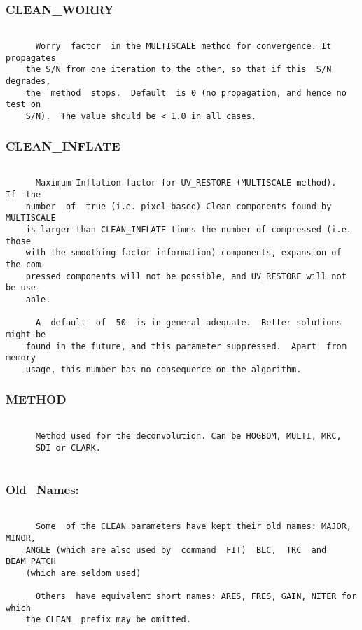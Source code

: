 \subsubsection{CLEAN\_WORRY}
\begin{verbatim}

      Worry  factor  in the MULTISCALE method for convergence. It propagates
    the S/N from one iteration to the other, so that if this  S/N  degrades,
    the  method  stops.  Default  is 0 (no propagation, and hence no test on
    S/N).  The value should be < 1.0 in all cases.

\end{verbatim}
\subsubsection{CLEAN\_INFLATE}
\begin{verbatim}

      Maximum Inflation factor for UV_RESTORE (MULTISCALE method).   If  the
    number  of  true (i.e. pixel based) Clean components found by MULTISCALE
    is larger than CLEAN_INFLATE times the number of compressed (i.e.  those
    with the smoothing factor information) components, expansion of the com-
    pressed components will not be possible, and UV_RESTORE will not be use-
    able.

      A  default  of  50  is in general adequate.  Better solutions might be
    found in the future, and this parameter suppressed.  Apart  from  memory
    usage, this number has no consequence on the algorithm.

\end{verbatim}
\subsubsection{METHOD}
\begin{verbatim}

      Method used for the deconvolution. Can be HOGBOM, MULTI, MRC,
      SDI or CLARK.


\end{verbatim}
\subsubsection{Old\_Names:}
\begin{verbatim}

      Some  of the CLEAN parameters have kept their old names: MAJOR, MINOR,
    ANGLE (which are also used by  command  FIT)  BLC,  TRC  and  BEAM_PATCH
    (which are seldom used)

      Others  have equivalent short names: ARES, FRES, GAIN, NITER for which
    the CLEAN_ prefix may be omitted.

\end{verbatim}
